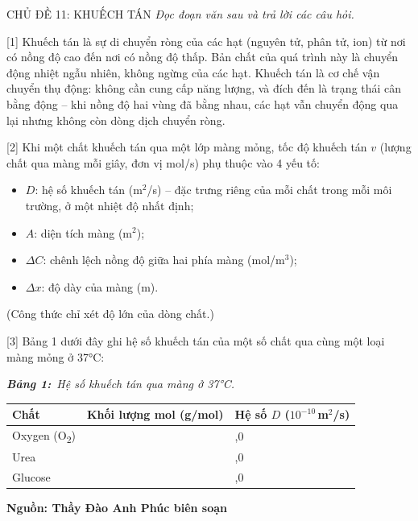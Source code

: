 \documentclass[12pt,a4paper,twoside]{article}
\newcommand{\tablecaption}[2]{%
    \par\vspace{2pt}%
    {\centering\textbf{\textit{Bảng #1:}}~\textit{#2}\par}%
    \vspace{0pt}%
}
\newenvironment{readingpassage}[1][]{%
    \begin{tcolorbox}[enhanced, colback=grayLight, colframe=secondaryBlue,
        coltitle=textDark, fonttitle=\bfseries, title={#1},
        rounded corners, arc=3mm, boxrule=1pt,
        left=15pt, right=15pt, top=10pt, bottom=10pt,
        breakable, before skip=10pt, after skip=10pt, drop fuzzy shadow]
    \setstretch{1.3}
}{\end{tcolorbox}}
\begin{document}
\label{b1_cd11}
\begin{topicbox}{\large CHỦ ĐỀ 11: KHUẾCH TÁN}
\vspace{8pt}
\textit{Đọc đoạn văn sau và trả lời các câu hỏi.}
\end{topicbox}
\vspace{5pt}
\begin{readingpassage}[]


[1] Khuếch tán là sự di chuyển ròng của các hạt (nguyên tử, phân tử, ion) từ nơi có nồng độ cao đến nơi có nồng độ thấp. Bản chất của quá trình này là chuyển động nhiệt ngẫu nhiên, không ngừng của các hạt. Khuếch tán là cơ chế vận chuyển thụ động: không cần cung cấp năng lượng, và đích đến là trạng thái cân bằng động -- khi nồng độ hai vùng đã bằng nhau, các hạt vẫn chuyển động qua lại nhưng không còn dòng dịch chuyển ròng.

[2] Khi một chất khuếch tán qua một lớp màng mỏng, tốc độ khuếch tán $v$ (lượng chất qua màng mỗi giây, đơn vị mol/s) phụ thuộc vào 4 yếu tố:
\begin{itemize}[leftmargin=2em, itemsep=2pt, label=\textcolor{primaryBlue}{\textbullet}]
\item $D$: hệ số khuếch tán (m$^2$/s) -- đặc trưng riêng của mỗi chất trong mỗi môi trường, ở một nhiệt độ nhất định;
\item $A$: diện tích màng (m$^2$);
\item $\Delta C$: chênh lệch nồng độ giữa hai phía màng (mol/m$^3$);
\item $\Delta x$: độ dày của màng (m).
\end{itemize}

\vspace{2pt}
\begin{center}
\end{center}
\vspace{2pt}

(Công thức chỉ xét độ lớn của dòng chất.)

[3] Bảng 1 dưới đây ghi hệ số khuếch tán của một số chất qua cùng một loại màng mỏng ở 37°C:

\vspace{4pt}
\tablecaption{1}{Hệ số khuếch tán qua màng ở 37°C.}
\renewcommand{\arraystretch}{1.4}
{\small
{}%
\begin{center}
\begin{tabular}{|>{\centering\arraybackslash}m{3cm}|>{\centering\arraybackslash}m{3.5cm}|>{\centering\arraybackslash}m{3.5cm}|}
\hline
\rowcolor{primaryBlue!12}
\textbf{Chất} & \textbf{Khối lượng mol (g/mol)} & \textbf{Hệ số $D$ ($10^{-10}$\,m$^2$/s)} \\
\hline
Oxygen (O\textsubscript{2}) & 32 & 20,0 \\
\hline
Urea & 60 & 10,0 \\
\hline
Glucose & 180 & 5,0 \\
\hline
\end{tabular}
\end{center}
}

\hfill\textbf{Nguồn: Thầy Đào Anh Phúc biên soạn}

\end{readingpassage}
\end{document}
